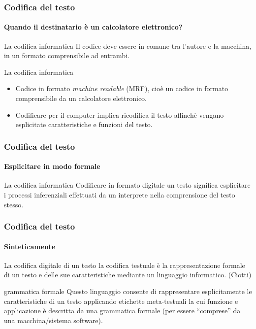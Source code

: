 \begin{frame}
	\frametitle{Codifica del testo}
	\framesubtitle{Quando il destinatario è un calcolatore elettronico?}
	\addtocounter{nframe}{1}

	\begin{block}{La codifica informatica}
		Il codice deve essere in comune tra l'autore e la macchina, in un formato comprensibile ad entrambi.
	\end{block}

	\begin{block}{La codifica informatica}
		\begin{itemize}
			\item Codice in formato \textit{machine readable} (MRF), cioè un codice in formato comprensibile da un calcolatore elettronico.
			\item Codificare per il computer implica ricodifica il testo affinchè vengano esplicitate caratteristiche e funzioni del testo.
		\end{itemize}
	\end{block}

\end{frame}

\begin{frame}
	\frametitle{Codifica del testo}
	\framesubtitle{Esplicitare in modo formale}
	\addtocounter{nframe}{1}

	\begin{block}{La codifica informatica}
		Codificare in formato digitale un testo significa esplicitare i processi inferenziali effettuati da un interprete nella comprensione del testo stesso.
	\end{block}


\end{frame}


\begin{frame}
	\frametitle{Codifica del testo}
	\framesubtitle{Sinteticamente}
	\addtocounter{nframe}{1}

	\begin{block}{La codifica digitale di un testo}
		la codifica testuale è la rappresentazione formale di un testo e delle sue caratteristiche mediante un linguaggio informatico. (Ciotti)
	\end{block}

	\begin{block}{grammatica formale}
		Questo linguaggio consente di rappresentare esplicitamente le caratteristiche di un testo applicando etichette meta-testuali la cui funzione e applicazione è descritta da una grammatica formale (per essere ``comprese'' da una macchina/sistema software).
	\end{block}
\end{frame}

